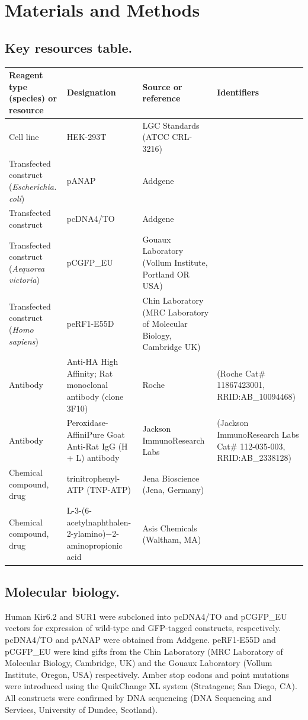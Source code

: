 \documentclass[10pt,lineno, doublespacing]{elife_modified}
\begin{document}
\section{Materials and Methods}

\subsection{Key resources table.}
\begin{tabular}{p{35mm} | p{30mm} | p{30mm} | p{30mm}}
\toprule
Reagent type (species) or resource & Designation & Source or reference & Identifiers \\
\midrule
Cell line & HEK-293T & LGC Standards (ATCC CRL-3216) & \\
Transfected construct (\textit{Escherichia. coli}) & pANAP & Addgene & \\
Transfected construct & pcDNA4/TO & Addgene & \\
Transfected construct (\textit{Aequorea victoria}) & pCGFP\_EU & Gouaux Laboratory (Vollum Institute, Portland OR USA) & \\
Transfected construct (\textit{Homo sapiens}) & peRF1-E55D & Chin Laboratory (MRC Laboratory of Molecular Biology, Cambridge UK) & \\
Antibody & Anti-HA High Affinity; Rat monoclonal antibody (clone 3F10) & Roche & (Roche Cat\# 11867423001, RRID:AB\_10094468) \\
Antibody & Peroxidase-AffiniPure Goat Anti-Rat IgG (H + L) antibody & Jackson ImmunoResearch Labs & (Jackson ImmunoResearch Labs Cat\# 112-035-003, RRID:AB\_2338128) \\
Chemical compound, drug & trinitrophenyl-ATP (TNP-ATP) & Jena Bioscience (Jena, Germany) & \\
Chemical compound, drug & L-3-(6-acetylnaphthalen-2-ylamino)−2-aminopropionic acid & Asis Chemicals (Waltham, MA) & \\
\midrule
\end{tabular}

\subsection{Molecular biology.}
Human Kir6.2 and SUR1 were subcloned into pcDNA4/TO and pCGFP\_EU vectors for expression of wild-type and GFP-tagged constructs, respectively.
pcDNA4/TO and pANAP were obtained from Addgene.
peRF1-E55D and pCGFP\_EU were kind gifts from the Chin Laboratory (MRC Laboratory of Molecular Biology, Cambridge, UK) and the Gouaux Laboratory (Vollum Institute, Oregon, USA) respectively.
Amber stop codons and point mutations were introduced using the QuikChange XL system (Stratagene; San Diego, CA).
All constructs were confirmed by DNA sequencing (DNA Sequencing and Services, University of Dundee, Scotland).
\end{document}

